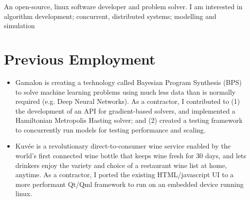 \documentclass[11pt,a4paper,sans]{moderncv}        %
\begin{document}
\makecvtitle

\small{An open-source, linux software developer and problem solver. I am
interested in algorithm development; concurrent, distributed systems; modelling
and simulation}

\vspace{12pt}

\section{Previous Employment}

\vspace{6pt}

\begin{itemize}

\item{}

  Gamalon is creating a technology called Bayesian Program Synthesis (BPS) to
  solve machine learning problems using much less data than is normally
  required (e.g. Deep Neural Networks). As a contractor, I contributed to (1)
  the development of an API for gradient-based solvers, and implemented a
  Hamiltonian Metropolis Hasting solver; and (2) created a testing framework to
  concurrently run models for testing performance and scaling.

\end{itemize}


\vspace{6pt}

\begin{itemize}

\item{}

  Kuvée is a revolutionary direct-to-consumer wine service enabled by the
  world’s first connected wine bottle that keeps wine fresh for 30 days, and
  lets drinkers enjoy the variety and choice of a restaurant wine list at home,
  anytime. As a contractor, I ported the existing HTML/javascript UI to a more
  performant Qt/Qml framework to run on an embedded device running linux.

\end{itemize}
\end{document}
